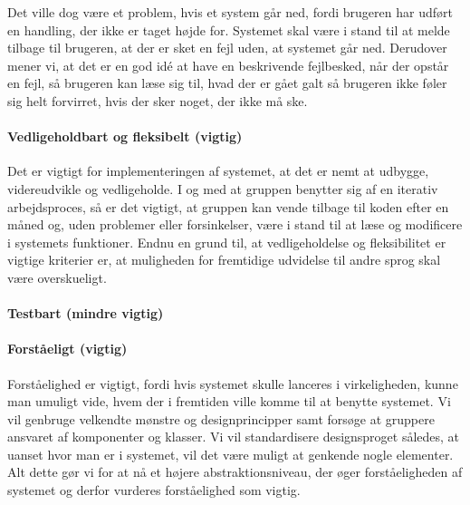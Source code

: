 Det ville dog være et problem, hvis et system går ned, fordi brugeren har udført en handling, der ikke er taget højde for. Systemet skal være i stand til at melde tilbage til brugeren, at der er sket en fejl uden, at systemet går ned. Derudover mener vi, at det er en god idé at have en beskrivende fejlbesked, når der opstår en fejl, så brugeren kan læse sig til, hvad der er gået galt så brugeren ikke føler sig helt forvirret, hvis der sker noget, der ikke må ske.

\paragraph{Vedligeholdbart og fleksibelt (vigtig)} 
Det er vigtigt for implementeringen af systemet, at det er nemt at udbygge, videreudvikle og vedligeholde. I og med at gruppen benytter sig af en iterativ arbejdsproces, så er det vigtigt, at gruppen kan vende tilbage til koden efter \fx en måned og, uden problemer eller forsinkelser, være i stand til at læse og modificere i systemets funktioner. Endnu en grund til, at vedligeholdelse og fleksibilitet er vigtige kriterier er, at muligheden for fremtidige udvidelse til \fx andre sprog skal være overskueligt.

\paragraph{Testbart (mindre vigtig)} 

\paragraph{Forståeligt (vigtig)} 
Forståelighed er vigtigt, fordi hvis systemet skulle lanceres i virkeligheden, kunne man umuligt vide, hvem der i fremtiden ville komme til at benytte systemet. Vi vil genbruge velkendte mønstre og designprincipper samt forsøge at gruppere ansvaret af komponenter og klasser. Vi vil standardisere designsproget således, at uanset hvor man er i systemet, vil det være muligt at genkende nogle elementer. Alt dette gør vi for at nå et højere abstraktionsniveau, der øger forståeligheden af systemet og derfor vurderes forståelighed som vigtig. 
 
